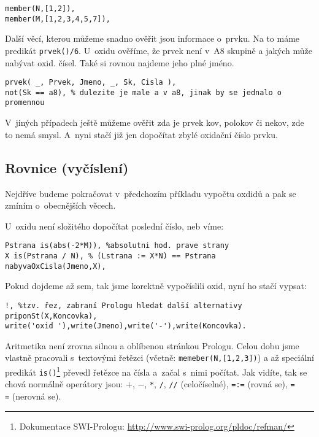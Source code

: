 \documentclass[a4paper]{article}
\begin{document}
\begin{verbatim}
member(N,[1,2]),
member(M,[1,2,3,4,5,7]),
\end{verbatim}

Další věcí, kterou můžeme snadno ověřit jsou informace o~prvku. Na to máme predikát \texttt{prvek()/6}. 
U~oxidu ověříme, že prvek není v~A8 skupině a jakých může nabývat oxid. čísel. Také si rovnou najdeme jeho 
plné jméno.

\begin{verbatim}
prvek( _, Prvek, Jmeno, _, Sk, Cisla ),
not(Sk == a8), % dulezite je male a v a8, jinak by se jednalo o promennou
\end{verbatim}

V~jiných případech ještě můžeme ověřit zda je prvek kov, polokov či nekov, zde to nemá smysl. A~nyni stačí
již jen dopočítat zbylé oxidační číslo prvku.

\subsection{Rovnice (vyčíslení)}
Nejdříve budeme pokračovat v~předchozím příkladu vypočtu oxdidů a pak se zmíním o~obecnějších věcech.

U~oxidu není složitého dopočítat poslední číslo, neb víme:

\begin{verbatim}
Pstrana is(abs(-2*M)), %absolutni hod. prave strany
X is(Pstrana / N), % (Lstrana := X*N) == Pstrana
nabyvaOxCisla(Jmeno,X),
\end{verbatim}

Pokud dojdeme až sem, tak jsme korektně vypočíslili oxid, nyní ho stačí vypsat:

\begin{verbatim}
!, %tzv. řez, zabraní Prologu hledat další alternativy
priponSt(X,Koncovka), 
write('oxid '),write(Jmeno),write('-'),write(Koncovka).
\end{verbatim}

Aritmetika není zrovna silnou a oblíbenou stránkou Prologu. Celou dobu jsme vlastně pracovali s~textovými
řetězci (včetně: \texttt{memeber(N,[1,2,3])}) a až speciální predikát \texttt{is()}\footnote{
Dokumentace SWI-Prologu: 
\href{http://www.swi-prolog.org/pldoc/refman/}{http://www.swi-prolog.org/pldoc/refman/}}
převedl řetězce na čísla a~začal s~nimi počítat. Jak vidíte, tak se chová normálně operátory jsou: 
\texttt{$+$}, \texttt{$-$}, \texttt{*}, \texttt{/}, \texttt{//} (celočíselné), \texttt{=:=} (rovná se), \texttt{=\\=} (nerovná se).
\end{document}
